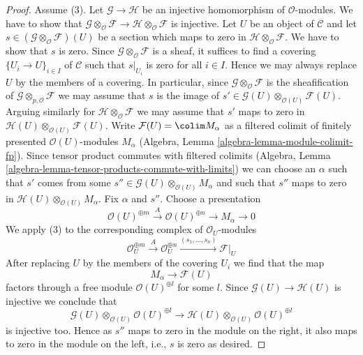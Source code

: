 \begin{proof}
\medskip\noindent
Assume (3). Let $\mathcal{G} \to \mathcal{H}$ be an injective homomorphism
of $\mathcal{O}$-modules. We have to show that
$\mathcal{G} \otimes_\mathcal{O} \mathcal{F} \to
\mathcal{H} \otimes_\mathcal{O} \mathcal{F}$
is injective. Let $U$ be an object of $\mathcal{C}$
and let $s \in (\mathcal{G} \otimes_\mathcal{O} \mathcal{F})(U)$
be a section which maps to zero in
$\mathcal{H} \otimes_\mathcal{O} \mathcal{F}$.
We have to show that $s$ is zero. Since
$\mathcal{G} \otimes_\mathcal{O} \mathcal{F}$
is a sheaf, it suffices to find a covering $\{U_i \to U\}_{i \in I}$
of $\mathcal{C}$ such that $s|_{U_i}$ is zero for all $i \in I$.
Hence we may always replace $U$ by the members of a covering.
In particular, since $\mathcal{G} \otimes_\mathcal{O} \mathcal{F}$
is the sheafification of $\mathcal{G} \otimes_{p, \mathcal{O}} \mathcal{F}$
we may assume that $s$ is the image of $s' \in
\mathcal{G}(U) \otimes_{\mathcal{O}(U)} \mathcal{F}(U)$.
Arguing similarly for $\mathcal{H} \otimes_\mathcal{O} \mathcal{F}$
we may assume that $s'$ maps to zero in
$\mathcal{H}(U) \otimes_{\mathcal{O}(U)} \mathcal{F}(U)$.
Write $\mathcal{F}(U) = \colim M_\alpha$ as a filtered colimit of finitely
presented $\mathcal{O}(U)$-modules $M_\alpha$
(Algebra, Lemma \ref{algebra-lemma-module-colimit-fp}).
Since tensor product commutes with filtered colimits
(Algebra, Lemma \ref{algebra-lemma-tensor-products-commute-with-limits})
we can choose an $\alpha$ such that $s'$
comes from some $s'' \in \mathcal{G}(U) \otimes_{\mathcal{O}(U)} M_\alpha$
and such that $s''$ maps to zero in
$\mathcal{H}(U) \otimes_{\mathcal{O}(U)} M_\alpha$.
Fix $\alpha$ and $s''$.
Choose a presentation
$$
\mathcal{O}(U)^{\oplus m} \xrightarrow{A} \mathcal{O}(U)^{\oplus n}
\to M_\alpha \to 0
$$
We apply (3) to the corresponding complex of $\mathcal{O}_U$-modules
$$
\mathcal{O}_U^{\oplus m} \xrightarrow{A}
\mathcal{O}_U^{\oplus n} \xrightarrow{(s_1, \ldots, s_n)}
\mathcal{F}|_U
$$
After replacing $U$ by the members of the covering $U_i$
we find that the map
$$
M_\alpha \to \mathcal{F}(U)
$$
factors through a free module $\mathcal{O}(U)^{\oplus l}$ for some $l$.
Since $\mathcal{G}(U) \to \mathcal{H}(U)$ is injective
we conclude that
$$
\mathcal{G}(U) \otimes_{\mathcal{O}(U)} \mathcal{O}(U)^{\oplus l}
\to
\mathcal{H}(U) \otimes_{\mathcal{O}(U)} \mathcal{O}(U)^{\oplus l}
$$
is injective too. Hence as $s''$ maps to zero in the module on
the right, it also maps to zero in the module on the left, i.e.,
$s$ is zero as desired.
\end{proof}

